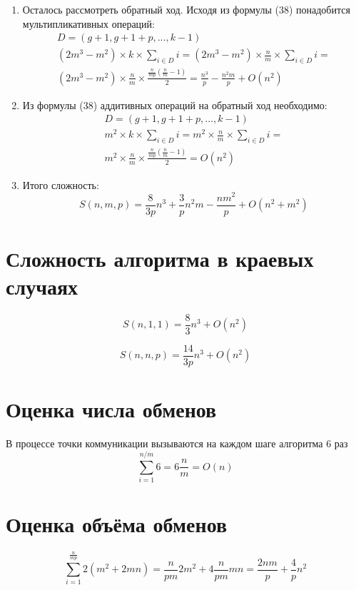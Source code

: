 \documentclass[12pt, a4paper]{article}
\begin{document}
\begin{enumerate}
\item Осталось рассмотреть обратный ход. Исходя из формулы (38) понадобится мультипликативных операций:
\begin{equation}
\begin{aligned}
D=(g+1,g+1+p, ...,k-1)\\(2m^3 - m^2) \times k \times \sum_{i \in D}i = (2m^3 - m^2) \times \frac{n}{m} \times \sum_{i \in D}i = \\ (2m^3 - m^2) \times \frac{n}{m} \times \frac{\frac{n}{mp}(\frac{n}{m}-1)}{2} = \frac{n^3}{p} - \frac{n^2m}{p} +O(n^2)
\end{aligned}
\end{equation}
\item Из формулы (38) аддитивных операций на обратный ход необходимо:
\begin{equation}
\begin{aligned}
D=(g+1,g+1+p, ...,k-1)\\m^2 \times k \times \sum_{i \in D}i = m^2 \times \frac{n}{m} \times \sum_{i \in D}i = \\ m^2 \times \frac{n}{m} \times \frac{\frac{n}{mp}(\frac{n}{m}-1)}{2} = O(n^2)
\end{aligned}
\end{equation}
\item Итого сложность:
\begin{equation}
S(n,m, p) = \frac{8}{3p}n^3 + \frac{3}{p}n^2m - \frac{nm^2}{p} + O(n^2 + m^2)
\end{equation}
\end{enumerate}

\section{Сложность алгоритма в краевых случаях}
\begin{equation}
S(n,1, 1) = \frac{8}{3}n^3 + O(n^2)
\end{equation}

\begin{equation}
S(n,n, p) = \frac{14}{3p}n^3 + O(n^2)
\end{equation}
\section{Оценка числа обменов}
В процессе точки коммуникации вызываются на каждом шаге алгоритма 6 раз 
\begin{equation}
\sum_{i=1}^{n/m}6=6\frac{n}{m} = O(n)
\end{equation}
\section{Оценка объёма обменов}
\begin{equation}
    \sum_{i=1}^{\frac{n}{mp}}2(m^2+2mn) = \frac{n}{pm}2m^2 + 4\frac{n}{pm}mn=\frac{2nm}{p} + \frac{4}{p}n^2
\end{equation}
\end{document}
